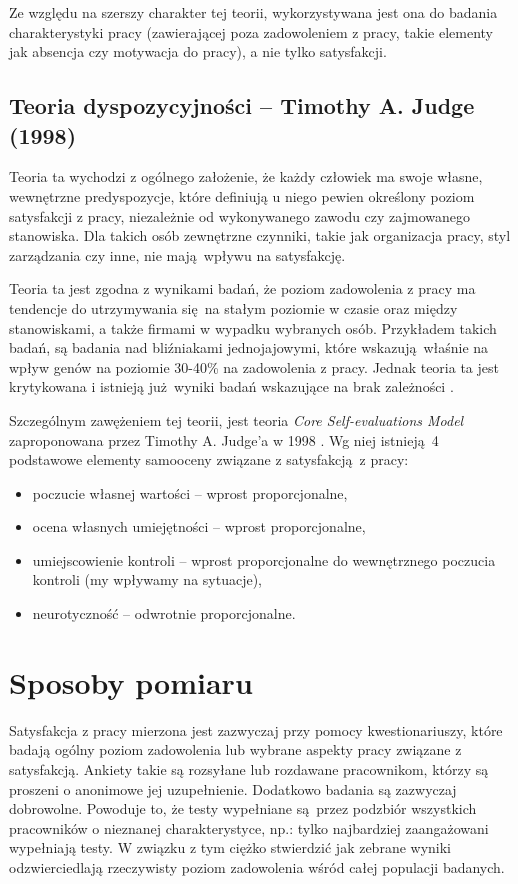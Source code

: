 Ze względu na szerszy charakter tej teorii, wykorzystywana jest ona do badania charakterystyki pracy (zawierającej poza zadowoleniem z pracy, takie elementy jak absencja czy motywacja do pracy), a nie tylko satysfakcji.

\subsection{Teoria dyspozycyjności -- Timothy A. Judge (1998)}
Teoria ta wychodzi z ogólnego założenie, że każdy człowiek ma swoje własne, wewnętrzne predyspozycje, które definiują u niego pewien określony poziom satysfakcji z pracy, niezależnie od wykonywanego zawodu czy zajmowanego stanowiska. Dla takich osób zewnętrzne czynniki, takie jak organizacja pracy, styl zarządzania czy inne, nie mają wpływu na satysfakcję.

Teoria ta jest zgodna z wynikami badań, że poziom zadowolenia z pracy ma tendencje do utrzymywania się na stałym poziomie w czasie oraz między stanowiskami, a także firmami w wypadku wybranych osób. Przykładem takich badań, są badania nad bliźniakami jednojajowymi, które wskazują właśnie na wpływ genów na poziomie 30-40\%  na zadowolenia z pracy. Jednak teoria ta jest krytykowana i istnieją już wyniki badań wskazujące na brak zależności \cite{schultz1985family}.

Szczególnym zawężeniem tej teorii, jest teoria \emph{Core Self-evaluations Model} zaproponowana przez Timothy A. Judge'a w 1998 \cite{judge1998dispositional,judge2001relationship}. Wg niej istnieją 4 podstawowe elementy samooceny związane z satysfakcją z pracy:
\begin{itemize}
\item poczucie własnej wartości -- wprost proporcjonalne,
\item ocena własnych umiejętności -- wprost proporcjonalne,
\item umiejscowienie kontroli -- wprost proporcjonalne do wewnętrznego poczucia kontroli (my wpływamy na sytuacje),
\item neurotyczność -- odwrotnie proporcjonalne.
\end{itemize}


\section{Sposoby pomiaru}
Satysfakcja z pracy mierzona jest zazwyczaj przy pomocy kwestionariuszy, które badają ogólny poziom zadowolenia lub wybrane aspekty pracy związane z satysfakcją. Ankiety takie są rozsyłane lub rozdawane pracownikom, którzy są proszeni o anonimowe jej uzupełnienie. Dodatkowo badania są zazwyczaj dobrowolne. Powoduje to, że testy wypełniane są przez podzbiór wszystkich pracowników o nieznanej charakterystyce, np.: tylko najbardziej zaangażowani wypełniają testy. W
związku z tym ciężko stwierdzić jak zebrane wyniki odzwierciedlają rzeczywisty poziom zadowolenia wśród całej populacji badanych.

